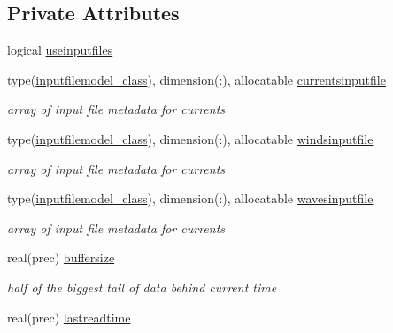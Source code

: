 \subsection*{Private Attributes}
\begin{DoxyCompactItemize}
\item 
logical \mbox{\hyperlink{structsimulationinputstreamer__mod_1_1input__streamer__class_ae5370d8623318a5fc15db31e99cfd148}{useinputfiles}}
\item 
type(\mbox{\hyperlink{structsimulationinputstreamer__mod_1_1inputfilemodel__class}{inputfilemodel\+\_\+class}}), dimension(\+:), allocatable \mbox{\hyperlink{structsimulationinputstreamer__mod_1_1input__streamer__class_aa12635920288984ada44e425ea05bf10}{currentsinputfile}}
\begin{DoxyCompactList}\small\item\em array of input file metadata for currents \end{DoxyCompactList}\item 
type(\mbox{\hyperlink{structsimulationinputstreamer__mod_1_1inputfilemodel__class}{inputfilemodel\+\_\+class}}), dimension(\+:), allocatable \mbox{\hyperlink{structsimulationinputstreamer__mod_1_1input__streamer__class_aff314be52a74d7bfb4db1e3b56c8b539}{windsinputfile}}
\begin{DoxyCompactList}\small\item\em array of input file metadata for currents \end{DoxyCompactList}\item 
type(\mbox{\hyperlink{structsimulationinputstreamer__mod_1_1inputfilemodel__class}{inputfilemodel\+\_\+class}}), dimension(\+:), allocatable \mbox{\hyperlink{structsimulationinputstreamer__mod_1_1input__streamer__class_afaf4ae68e00fdca31e5c59dadd94e05d}{wavesinputfile}}
\begin{DoxyCompactList}\small\item\em array of input file metadata for currents \end{DoxyCompactList}\item 
real(prec) \mbox{\hyperlink{structsimulationinputstreamer__mod_1_1input__streamer__class_a840b26872bc3a8ddb8bab387590860d6}{buffersize}}
\begin{DoxyCompactList}\small\item\em half of the biggest tail of data behind current time \end{DoxyCompactList}\item 
real(prec) \mbox{\hyperlink{structsimulationinputstreamer__mod_1_1input__streamer__class_a827d38efa4fcc80677907577c173eb14}{lastreadtime}}
\end{DoxyCompactItemize}


